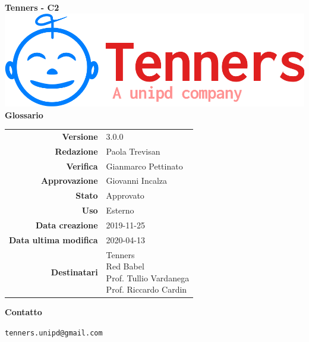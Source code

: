 \begin{titlepage}
	\begin{center}
		\large \textbf{Tenners - C2}
		\vfill
		\includegraphics[scale = 0.3]{./res/img/logo.png}\\
		\vfill
		\Huge \textbf{Glossario}

        \vfill
        \large

        \begin{tabular}{r|l}
                        \textbf{Versione} & 3.0.0 \\
                        \textbf{Redazione} &
                        Paola Trevisan\\
                        \textbf{Verifica} &
                        Gianmarco Pettinato \\
                        \textbf{Approvazione} & Giovanni Incalza \\
                        \textbf{Stato} & Approvato \\
                        \textbf{Uso} &  Esterno\\
                        \textbf{Data creazione} &  2019-11-25\\
                        \textbf{Data ultima modifica} & 2020-04-13 \\
                        \textbf{Destinatari} & \parbox[t]{5cm}{Tenners \\ Red Babel \\ Prof. Tullio Vardanega\\Prof. Riccardo Cardin}
                \end{tabular}
                \vfill
                \normalsize
                \vfill
                \textbf{Contatto}
                
                \texttt{tenners.unipd@gmail.com}

	\end{center}
\end{titlepage}